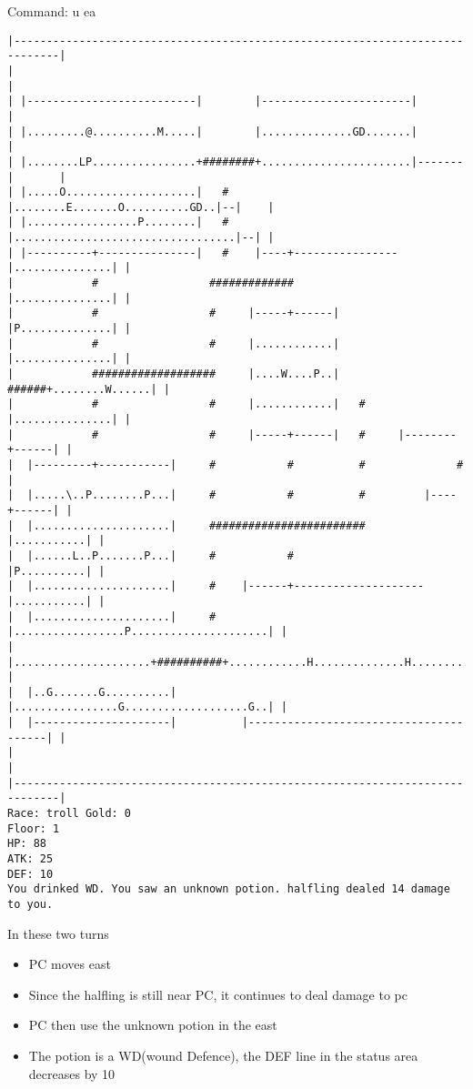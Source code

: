 \documentclass[11pt]{article}
\theoremstyle{plain}
\begin{document}
Command: u ea
\begin{Verbatim}[fontsize=\scriptsize]
|-----------------------------------------------------------------------------|
|                                                                             |
| |--------------------------|        |-----------------------|               |
| |.........@..........M.....|        |..............GD.......|               |
| |........LP................+########+.......................|-------|       |
| |.....O....................|   #    |........E.......O..........GD..|--|    |
| |.................P........|   #    |..................................|--| |
| |----------+---------------|   #    |----+----------------|...............| |
|            #                 #############                |...............| |
|            #                 #     |-----+------|         |P..............| |
|            #                 #     |............|         |...............| |
|            ###################     |....W....P..|   ######+........W......| |
|            #                 #     |............|   #     |...............| |
|            #                 #     |-----+------|   #     |--------+------| |
|  |---------+-----------|     #           #          #              #        |
|  |.....\..P........P...|     #           #          #         |----+------| |
|  |.....................|     ########################         |...........| |
|  |......L..P.......P...|     #           #                    |P..........| |
|  |.....................|     #    |------+--------------------|...........| |
|  |.....................|     #    |.................P.....................| |
|  |.....................+##########+............H..............H...........| |
|  |..G.......G..........|          |................G...................G..| |
|  |---------------------|          |---------------------------------------| |
|                                                                             |
|-----------------------------------------------------------------------------|
Race: troll Gold: 0                                                    Floor: 1
HP: 88
ATK: 25
DEF: 10
You drinked WD. You saw an unknown potion. halfling dealed 14 damage to you. 
\end{Verbatim}

In these two turns
\begin{itemize}
	\item PC moves east
    \item Since the halfling is still near PC, it continues to deal damage to pc
    \item PC then use the unknown potion in the east
    \item The potion is a WD(wound Defence), the DEF line in the status area decreases by 10
\end{itemize}
\end{document}
